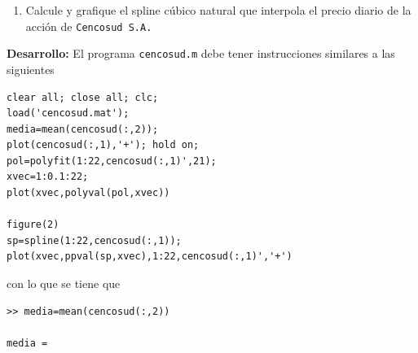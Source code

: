 \documentclass[letter,11pt]{article}
\begin{document}
\begin{enumerate}
\begin{enumerate}
\item Calcule y grafique el spline c\'ubico natural que interpola el precio diario de la acci\'on de \texttt{Cencosud S.A.}

\end{enumerate}
\textbf{Desarrollo:} El programa \texttt{cencosud.m} debe tener instrucciones similares a las siguientes
\begin{lstlisting}
clear all; close all; clc;
load('cencosud.mat');
media=mean(cencosud(:,2));
plot(cencosud(:,1),'+'); hold on;
pol=polyfit(1:22,cencosud(:,1)',21);
xvec=1:0.1:22;
plot(xvec,polyval(pol,xvec))

figure(2)
sp=spline(1:22,cencosud(:,1));
plot(xvec,ppval(sp,xvec),1:22,cencosud(:,1)','+')
\end{lstlisting}
con lo que se tiene que 
\begin{lstlisting}
>> media=mean(cencosud(:,2))

media =


\end{lstlisting}
\end{enumerate}
\end{document}
